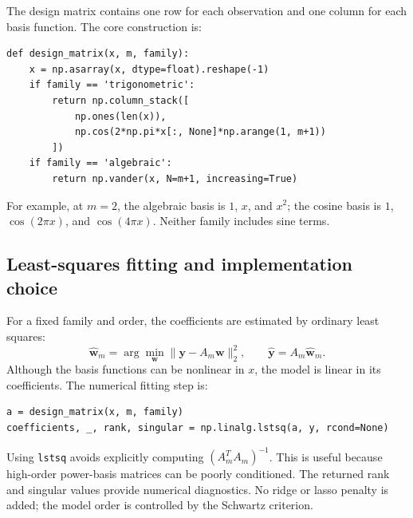 \documentclass[11pt,a4paper]{article}
\begin{document}
The design matrix contains one row for each observation and one column for each basis function. The core construction is:
\par\addvspace{4pt}
\noindent\begin{minipage}{\linewidth}
\begin{lstlisting}[style=pythoncode,caption={Constructing the cosine or algebraic design matrix.}]
def design_matrix(x, m, family):
    x = np.asarray(x, dtype=float).reshape(-1)
    if family == 'trigonometric':
        return np.column_stack([
            np.ones(len(x)),
            np.cos(2*np.pi*x[:, None]*np.arange(1, m+1))
        ])
    if family == 'algebraic':
        return np.vander(x, N=m+1, increasing=True)
\end{lstlisting}
\end{minipage}\par\addvspace{4pt}
For example, at $m=2$, the algebraic basis is $1$, $x$, and $x^2$; the cosine basis is $1$, $\cos(2\pi x)$, and $\cos(4\pi x)$. Neither family includes sine terms.

\subsection*{Least-squares fitting and implementation choice}
For a fixed family and order, the coefficients are estimated by ordinary least squares:
\begin{equation}
\widehat{\boldsymbol w}_m
=\arg\min_{\boldsymbol w}\|\boldsymbol y-A_m\boldsymbol w\|_2^2,
\qquad \widehat{\boldsymbol y}=A_m\widehat{\boldsymbol w}_m.
\end{equation}
Although the basis functions can be nonlinear in $x$, the model is linear in its coefficients. The numerical fitting step is:
\par\addvspace{4pt}
\noindent\begin{minipage}{\linewidth}
\begin{lstlisting}[style=pythoncode,caption={Least-squares estimation for a fixed family and order.}]
a = design_matrix(x, m, family)
coefficients, _, rank, singular = np.linalg.lstsq(a, y, rcond=None)
\end{lstlisting}
\end{minipage}\par\addvspace{4pt}
Using \texttt{lstsq} avoids explicitly computing $(A_m^TA_m)^{-1}$. This is useful because high-order power-basis matrices can be poorly conditioned. The returned rank and singular values provide numerical diagnostics. No ridge or lasso penalty is added; the model order is controlled by the Schwartz criterion.
\end{document}
